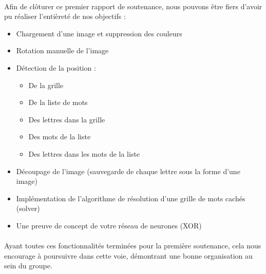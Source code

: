 \documentclass{article}
\begin{document}
\paragraph{}
Afin de cl\^oturer ce premier rapport de soutenance, nous pouvons \^etre fiers d'avoir pu r\'ealiser l'enti\`eret\'e de nos objectifs :
\begin{itemize}
    \item Chargement d'une image et suppression des couleurs 
    \item Rotation manuelle de l'image 
    \item D\'etection de la position : 
    \begin{itemize}
        \item De la grille
        \item De la liste de mots
        \item Des lettres dans la grille
        \item Des mots de la liste
        \item Des lettres dans les mots de la liste
    \end{itemize}
    \item D\'ecoupage de l'image (sauvegarde de chaque lettre sous la forme d'une image)
    \item Impl\'ementation de l'algorithme de r\'esolution d'une grille de mots cach\'es (solver)
    \item Une preuve de concept de votre r\'eseau de neurones (XOR)
\end{itemize}
\paragraph{}
Ayant toutes ces fonctionnalit\'es termin\'ees pour la premi\`ere soutenance, cela nous encourage \`a poursuivre dans cette voie, d\'emontrant une bonne organisation au sein du groupe.
\end{document}
